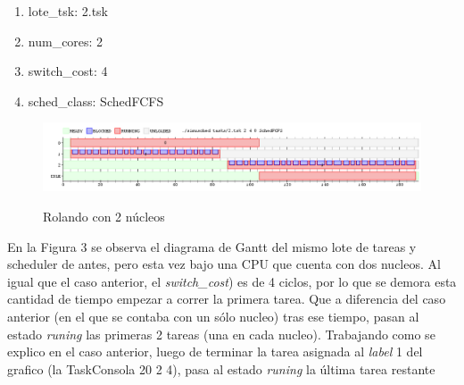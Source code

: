 \begin{enumerate}
	\item lote\_tsk: 2.tsk
	\item num\_cores: 2
	\item switch\_cost: 4
	\item sched\_class: SchedFCFS
\end{enumerate}

\begin{figure}[h]
    \includegraphics[width=\linewidth]{images/2_2nucleos.png}
    \label{fig:Task Consola}
    \caption{Rolando con 2 núcleos}
\end{figure}

En la Figura 3 se observa el diagrama de Gantt del mismo lote de tareas y scheduler de antes, pero esta vez bajo una CPU que cuenta con dos nucleos. Al igual que el caso anterior, el \textit{switch\_cost}) es de 4 ciclos, por lo que se demora esta cantidad de tiempo empezar a correr la primera tarea. Que a diferencia del caso anterior (en el que se contaba con un s\'olo nucleo) tras ese tiempo, pasan al estado \textit{runing} las primeras 2 tareas (una en cada nucleo). Trabajando como se explico en el caso anterior, luego de terminar la tarea asignada al \textit{label} 1 del grafico (la TaskConsola 20 2 4), pasa al estado \textit{runing} la \'ultima tarea restante  